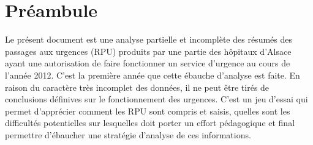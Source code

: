 \section{Préambule}

Le présent document est une analyse partielle et incomplète des résumés des passages aux urgences (RPU) produits par une partie des hôpitaux d'Alsace ayant une autorisation de faire fonctionner un service d'urgence au cours de l'année 2012. C'est la première année que cette ébauche d'analyse est faite. En raison du caractère très incomplet des données, il ne peut être
tirés de conclusions définives sur le fonctionnement des urgences. C'est un jeu d'essai qui permet d'apprécier comment les RPU sont compris et saisis, quelles sont les difficultés potentielles sur lesquelles doit porter un effort pédagogique et final permettre d'ébaucher une stratégie d'analyse de ces informations.